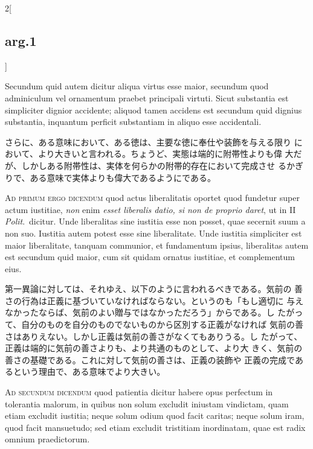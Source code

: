 \documentclass[paper=a4paper,fontsize=10pt,jafontsize=9pt,titlepage]{jlreq}
\begin{document}
\begin{paracol}{2}[\subsection{arg.1}]
\switchcolumn*

Secundum quid autem dicitur aliqua virtus esse maior, secundum quod
adminiculum vel ornamentum praebet principali virtuti. Sicut
substantia est simpliciter dignior accidente; aliquod tamen accidens
est secundum quid dignius substantia, inquantum perficit substantiam
in aliquo esse accidentali.

\switchcolumn

さらに、ある意味において、ある徳は、主要な徳に奉仕や装飾を与える限り
 において、より大きいと言われる。ちょうど、実態は端的に附帯性よりも偉
 大だが、しかしある附帯性は、実体を何らかの附帯的存在において完成させ
 るかぎりで、ある意味で実体よりも偉大であるようにである。

\switchcolumn*[\subsection{ad.1}]

{\scshape Ad primum ergo dicendum} quod actus liberalitatis oportet
quod fundetur super actum iustitiae, {\itshape non} enim {\itshape
esset liberalis datio, si non de proprio daret}, ut in II {\itshape
Polit}.~dicitur. Unde liberalitas sine iustitia esse non posset, quae
secernit suum a non suo. Iustitia autem potest esse sine
liberalitate. Unde iustitia simpliciter est maior liberalitate,
tanquam communior, et fundamentum ipsius, liberalitas autem est
secundum quid maior, cum sit quidam ornatus iustitiae, et complementum
eius.

\switchcolumn

第一異論に対しては、それゆえ、以下のように言われるべきである。気前の
 善さの行為は正義に基づいていなければならない。というのも「もし適切に
 与えなかったならば、気前のよい贈与ではなかっただろう」からである。し
 たがって、自分のものを自分のものでないものから区別する正義がなければ
 気前の善さはありえない。しかし正義は気前の善さがなくてもありうる。し
 たがって、正義は端的に気前の善さよりも、より共通のものとして、より大
 きく、気前の善さの基礎である。これに対して気前の善さは、正義の装飾や
 正義の完成であるという理由で、ある意味でより大きい。

\switchcolumn*[\subsection{ad.2}]

{\scshape Ad secundum dicendum} quod patientia dicitur habere opus
perfectum in tolerantia malorum, in quibus non solum excludit iniustam
vindictam, quam etiam excludit iustitia; neque solum odium quod facit
caritas; neque solum iram, quod facit mansuetudo; sed etiam excludit
tristitiam inordinatam, quae est radix omnium praedictorum.


\end{paracol}
\end{document}
